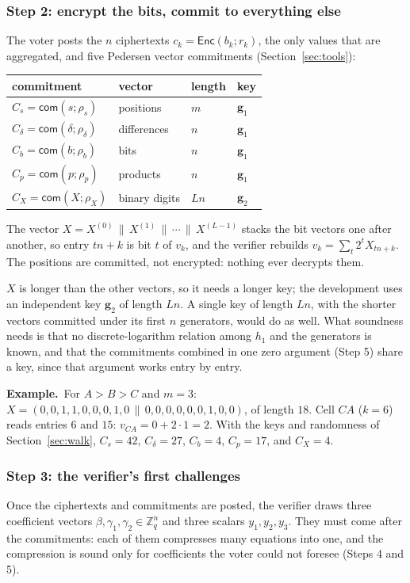 \documentclass[11pt,a4paper]{article}
\newcommand{\Z}{\mathbb{Z}}
\newcommand{\Enc}{\mathsf{Enc}}
\newcommand{\com}{\mathsf{com}}
\newcommand{\ex}[1]{\par\medskip\noindent\textbf{Example.}~#1\par\medskip}
\theoremstyle{remark}
\begin{document}
\subsubsection*{Step 2: encrypt the bits, commit to everything else}
The voter posts the $n$ ciphertexts $c_k = \Enc(b_k; r_k)$, the only values
that are aggregated, and five Pedersen vector commitments
(Section~\ref{sec:tools}):
\begin{center}
\begin{tabular}{@{}llll@{}}
\toprule
commitment & vector & length & key \\
\midrule
$C_s = \com(s; \rho_s)$ & positions & $m$ & $\mathbf{g}_1$ \\
$C_\delta = \com(\delta; \rho_\delta)$ & differences & $n$ & $\mathbf{g}_1$ \\
$C_b = \com(b; \rho_b)$ & bits & $n$ & $\mathbf{g}_1$ \\
$C_p = \com(p; \rho_p)$ & products & $n$ & $\mathbf{g}_1$ \\
$C_X = \com(X; \rho_X)$ & binary digits & $Ln$ & $\mathbf{g}_2$ \\
\bottomrule
\end{tabular}
\end{center}
The vector $X = X^{(0)} \,\|\, X^{(1)} \,\|\, \cdots \,\|\, X^{(L-1)}$ stacks
the bit vectors one after another, so entry $tn + k$ is bit $t$ of $v_k$,
and the verifier rebuilds $v_k = \sum_t 2^{t} X_{tn + k}$. The positions
are committed, not encrypted: nothing ever decrypts them.

$X$ is longer than the other vectors, so it needs a longer key; the
development uses an independent key $\mathbf{g}_2$ of length $Ln$. A single
key of length $Ln$, with the shorter vectors committed under its first
$n$ generators, would do as well. What soundness needs is that no
discrete-logarithm relation among $h_1$ and the generators is known, and
that the commitments combined in one zero argument (Step 5) share a key,
since that argument works entry by entry.

\ex{For $A > B > C$ and $m = 3$: $X = (0,0,1,1,0,0,0,1,0 \,\|\,
0,0,0,0,0,0,1,0,0)$, of length $18$. Cell $CA$ ($k = 6$) reads entries $6$
and $15$: $v_{CA} = 0 + 2 \cdot 1 = 2$. With the keys and randomness of
Section~\ref{sec:walk}, $C_s = 42$, $C_\delta = 27$, $C_b = 4$, $C_p = 17$,
and $C_X = 4$.}

\subsubsection*{Step 3: the verifier's first challenges}
Once the ciphertexts and commitments are posted, the verifier draws three
coefficient vectors $\beta, \gamma_1, \gamma_2 \in \Z_q^{n}$ and three
scalars $y_1, y_2, y_3$. They must come after the commitments: each of them
compresses many equations into one, and the compression is sound only for
coefficients the voter could not foresee (Steps 4 and 5).
\end{document}
